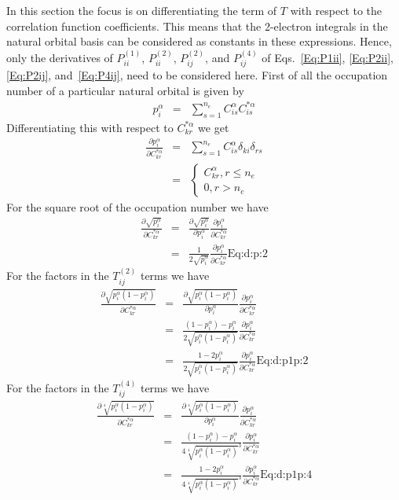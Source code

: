 \documentclass[pra,nofootinbib]{revtex4-1}
\newcommand{\dlabel}[1]{\text{#1}\label{#1}}
\begin{document}
In this section the focus is on differentiating the term of $T$ with respect to the 
correlation function coefficients. This means that the 2-electron integrals in the 
natural orbital basis can be considered as constants in these expressions. Hence,
only the derivatives of $P^{(1)}_{ii}$, $P^{(2)}_{ii}$, $P^{(2)}_{ij}$, and $P^{(4)}_{ij}$
of Eqs.~\ref{Eq:P1ii}, \ref{Eq:P2ii}, \ref{Eq:P2ij}, and~\ref{Eq:P4ij},
need to be considered here.
First of all the occupation number of a particular natural orbital is given by
\begin{eqnarray}
   p_i^\alpha &=& \sum_{s=1}^{n_e}C_{is}^\alpha C_{is}^{*\alpha}
\end{eqnarray}
Differentiating this with respect to $C_{kr}^{*\alpha}$ we get
\begin{eqnarray}
   \frac{\partial p_i^\alpha}{\partial C_{kr}^{*\alpha}}
   &=& \sum_{s=1}^{n_e}C_{is}^\alpha \delta_{ki}\delta_{rs} \\
   &=& \left\{
       \begin{array}{l}
         C_{kr}^\alpha, r \le n_e \\
         0, r > n_e
       \end{array}
       \right.
\end{eqnarray}
For the square root of the occupation number we have
\begin{eqnarray}
   \frac{\partial \sqrt{p_i^\alpha}}{\partial C_{kr}^{*\alpha}}
   &=& \frac{\partial \sqrt{p_i^\alpha}}{\partial p_i^\alpha}
       \frac{\partial p_i^\alpha}{\partial C_{kr}^{*\alpha}} \\
   &=& \frac{1}{2\sqrt{p_i^\alpha}}\frac{\partial p_i^\alpha}{\partial C_{kr}^{*\alpha}}
       \dlabel{Eq:d:p:2}
\end{eqnarray}
For the factors in the $T_{ij}^{(2)}$ terms we have
\begin{eqnarray}
   \frac{\partial \sqrt{p_i^\alpha(1-p_i^\alpha)}}{\partial C_{kr}^{*\alpha}}
   &=& \frac{\partial \sqrt{p_i^\alpha(1-p_i^\alpha)}}{\partial p_i^\alpha}
       \frac{\partial p_i^\alpha}{\partial C_{kr}^{*\alpha}} \\
   &=& \frac{(1-p_i^\alpha)-p_i^\alpha}{2\sqrt{p_i^\alpha(1-p_i^\alpha)}}
       \frac{\partial p_i^\alpha}{\partial C_{kr}^{*\alpha}} \\
   &=& \frac{1-2p_i^\alpha}{2\sqrt{p_i^\alpha(1-p_i^\alpha)}}
       \frac{\partial p_i^\alpha}{\partial C_{kr}^{*\alpha}}
       \dlabel{Eq:d:p1p:2}
\end{eqnarray}
For the factors in the $T_{ij}^{(4)}$ terms we have
\begin{eqnarray}
   \frac{\partial \sqrt[4]{p_i^\alpha(1-p_i^\alpha)}}{\partial C_{kr}^{*\alpha}}
   &=& \frac{\partial \sqrt[4]{p_i^\alpha(1-p_i^\alpha)}}{\partial p_i^\alpha}
       \frac{\partial p_i^\alpha}{\partial C_{kr}^{*\alpha}} \\
   &=& \frac{(1-p_i^\alpha)-p_i^\alpha}{4\sqrt[4]{p_i^\alpha(1-p_i^\alpha)}^3}
       \frac{\partial p_i^\alpha}{\partial C_{kr}^{*\alpha}} \\
   &=& \frac{1-2p_i^\alpha}{4\sqrt[4]{p_i^\alpha(1-p_i^\alpha)}^3}
       \frac{\partial p_i^\alpha}{\partial C_{kr}^{*\alpha}}
       \dlabel{Eq:d:p1p:4}
\end{eqnarray}
\end{document}
